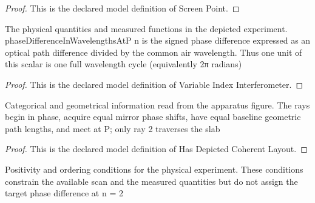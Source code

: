 \begin{proof}
  This is the declared model definition of Screen Point.
\end{proof}
\begin{definition}
  \label{def:physics:phyx-mini-0089:phyxminiproblems-problemphyxmini0089-variableindexinterferometer}
  The physical quantities and measured functions in the depicted experiment. phaseDifferenceInWavelengthsAtP n is the signed phase difference expressed as an optical path difference divided by the common air wavelength. Thus one unit of this scalar is one full wavelength cycle (equivalently 2π radians)
\end{definition}
\begin{proof}
  This is the declared model definition of Variable Index Interferometer.
\end{proof}
\begin{definition}
  \label{def:physics:phyx-mini-0089:phyxminiproblems-problemphyxmini0089-hasdepictedcoherentlayout}
  Categorical and geometrical information read from the apparatus figure. The rays begin in phase, acquire equal mirror phase shifts, have equal baseline geometric path lengths, and meet at P; only ray 2 traverses the slab
\end{definition}
\begin{proof}
  This is the declared model definition of Has Depicted Coherent Layout.
\end{proof}
\begin{definition}
  \label{def:physics:phyx-mini-0089:phyxminiproblems-problemphyxmini0089-hasphysicalopticalparameters}
  Positivity and ordering conditions for the physical experiment. These conditions constrain the available scan and the measured quantities but do not assign the target phase difference at n = 2
\end{definition}
